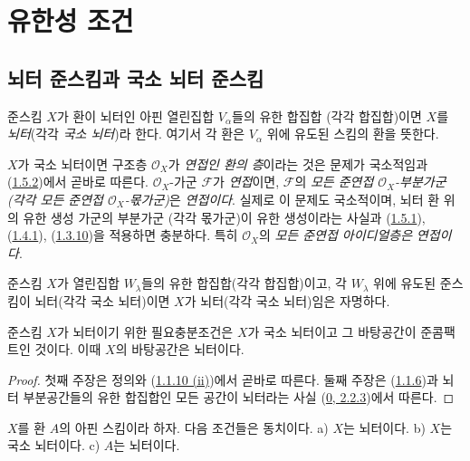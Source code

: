 \section{유한성 조건}
\label{section:I.6-ko}

\subsection{뇌터 준스킴과 국소 뇌터 준스킴}
\label{subsection:I.6.1-ko}

\begin{definition}[6.1.1]
\label{I.6.1.1-ko}
준스킴 $X$가 환이 뇌터인 아핀 열린집합 $V_\alpha$들의 유한 합집합
(각각 합집합)이면 $X$를 \emph{뇌터}(각각 \emph{국소 뇌터})라 한다.
여기서 각 환은 $V_\alpha$ 위에 유도된 스킴의 환을 뜻한다.
\end{definition}

$X$가 국소 뇌터이면 구조층 $\mathscr{O}_X$가
\emph{연접인 환의 층}이라는 것은 문제가 국소적임과
(\hyperref[I.1.5.2-ko]{1.5.2})에서 곧바로 따른다.
$\mathscr{O}_X$-가군 $\mathscr{F}$가 \emph{연접}이면,
$\mathscr{F}$의 \emph{모든 준연접 $\mathscr{O}_X$-부분가군}
\emph{(각각 모든 준연접 $\mathscr{O}_X$-몫가군)}은
\emph{연접이다}.
실제로 이 문제도 국소적이며, 뇌터 환 위의 유한 생성 가군의 부분가군
(각각 몫가군)이 유한 생성이라는 사실과
(\hyperref[I.1.5.1-ko]{1.5.1}),
(\hyperref[I.1.4.1-ko]{1.4.1}),
(\hyperref[I.1.3.10-ko]{1.3.10})을 적용하면 충분하다. 특히
$\mathscr{O}_X$의 \emph{모든 준연접 아이디얼층은} \emph{연접이다}.

준스킴 $X$가 열린집합 $W_\lambda$들의 유한 합집합(각각 합집합)이고,
각 $W_\lambda$ 위에 유도된 준스킴이 뇌터(각각 국소 뇌터)이면 $X$가
뇌터(각각 국소 뇌터)임은 자명하다.

\begin{proposition}[6.1.2]
\label{I.6.1.2-ko}
준스킴 $X$가 뇌터이기 위한 필요충분조건은 $X$가 국소 뇌터이고 그
바탕공간이 준콤팩트인 것이다. 이때 $X$의 바탕공간은 뇌터이다.
\end{proposition}

\begin{proof}
첫째 주장은 정의와 (\hyperref[I.1.1.10-ko]{1.1.10 (ii)})에서 곧바로
따른다. 둘째 주장은 (\hyperref[I.1.1.6-ko]{1.1.6})과 뇌터
부분공간들의 유한 합집합인 모든 공간이 뇌터라는 사실
(\hyperref[0.2.2.3-ko]{0, 2.2.3})에서 따른다.
\end{proof}

\begin{proposition}[6.1.3]
\label{I.6.1.3-ko}
$X$를 환 $A$의 아핀 스킴이라 하자. 다음 조건들은 동치이다.
a) $X$는 뇌터이다. b) $X$는 국소 뇌터이다. c) $A$는 뇌터이다.
\end{proposition}


